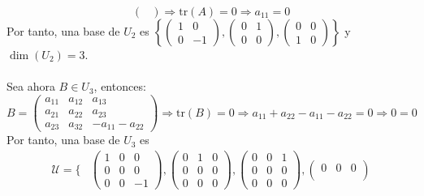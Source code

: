 \begin{ejercicio}
\begin{enumerate}
\begin{equation*}
\begin{pmatrix}
			      \end{pmatrix} \Rightarrow \text{tr}(A) = 0 \Rightarrow a_{11} = 0
		      \end{equation*}
		      Por tanto, una base de $U_2$ es $\left\{ \begin{pmatrix}
				      1 & 0  \\
				      0 & -1
			      \end{pmatrix}, \begin{pmatrix}
				      0 & 1 \\
				      0 & 0
			      \end{pmatrix}, \begin{pmatrix}
				      0 & 0 \\
				      1 & 0
			      \end{pmatrix} \right\}$ y $\dim(U_2) = 3$.
		      \\ \\
		      Sea ahora $B \in U_3$, entonces:
		      \begin{equation*}
			      B = \begin{pmatrix}
				      a_{11} & a_{12} & a_{13}           \\
				      a_{21} & a_{22} & a_{23}           \\
				      a_{23} & a_{32} & - a_{11} -a_{22}
			      \end{pmatrix} \Rightarrow \text{tr}(B) = 0 \Rightarrow a_{11} + a_{22} - a_{11} - a_{22} = 0 \Rightarrow 0 = 0
		      \end{equation*}
		      Por tanto, una base de $U_3$ es
		      \begin{align*}
			      \mathcal{U} = \{
			       & \begin{pmatrix}
				         1 & 0 & 0  \\
				         0 & 0 & 0  \\
				         0 & 0 & -1
			         \end{pmatrix},
			      \begin{pmatrix}
				      0 & 1 & 0 \\
				      0 & 0 & 0 \\
				      0 & 0 & 0
			      \end{pmatrix},
			      \begin{pmatrix}
				      0 & 0 & 1 \\
				      0 & 0 & 0 \\
				      0 & 0 & 0
			      \end{pmatrix},
			      \begin{pmatrix}
				      0 & 0 & 0 \\

\end{pmatrix}
\end{align*}
\end{enumerate}
\end{ejercicio}
